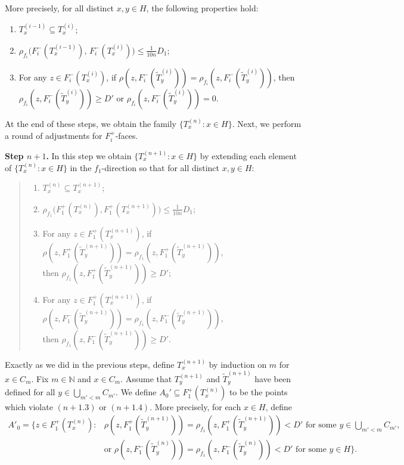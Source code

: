 \documentclass[11pt, reqno, a4paper]{amsart}
\theoremstyle{definition}
\theoremstyle{plain}
\begin{document}
More precisely, for all distinct $x,y\in H$, the following
properties hold:
\begin{enumerate}[label=($i$.\arabic*),leftmargin=3.2em]
  \item $T_x^{(i-1)}\subseteq T_x^{(i)}$;
  \item $\rho_{f_i}\!\bigl(F_i^-(T_x^{(i-1)}),\,F_i^-(T_x^{(i)})\bigr)\le \frac{1}{10n}D_1$;
  \item For any $z\in F_i^-(T_x^{(i)})$, if $\rho(z, F_i^-(\widetilde T_y^{(i)}))=\rho_{f_i}(z, F_i^-(\widetilde T_y^{(i)}))$, then $\rho_{f_i}(z, F_i^-(\widetilde T_y^{(i)}))\ge D'$ or $\rho_{f_i}(z, F_i^-(\widetilde T_y^{(i)}))=0$.
\end{enumerate}


\medskip
\noindent
At the end of these steps, we obtain the family $\{T_x^{(n)}\colon x\in H\}$. Next, we perform a round of adjustments for $F_i^+$-faces.

\medskip
\noindent\textbf{Step $n+1$.}
In this step we obtain $\{T_x^{(n+1)}:x\in H\}$ by extending each element of $\{T_x^{(n)}:x\in H\}$ in the $f_1$-direction so that
for all distinct $x,y\in H$:
\begin{quote}
\begin{enumerate}[label=($n+1$.\arabic*),leftmargin=3.2em]
\item $T_x^{(n)}\subseteq T_x^{(n+1)}$;
  \item $\rho_{f_1}\bigl(F_1^+(T_x^{(n)}),F_1^+(T_x^{(n+1)})\bigr)\le \frac{1}{10n}D_1$;
\item  For any $z\in F_1^+(T_x^{(n+1)})$, if $\rho(z, F_1^+(\widetilde T_y^{(n+1)}))=
\rho_{f_1}(z, F_1^+(\widetilde T_y^{(n+1)}))$, \\then $\rho_{f_1}(z, F_1^+(\widetilde T_y^{(n+1)}))\ge D'$;
\item  For any $z\in F_1^+(T_x^{(n+1)})$, if $\rho(z, F_1^-(\widetilde T_y^{(n+1)}))=
\rho_{f_1}(z, F_1^-(\widetilde T_y^{(n+1)}))$, \\then $\rho_{f_1}(z, F_1^-(\widetilde T_y^{(n+1)}))\ge D'$.
\end{enumerate}
\end{quote}

Exactly as we did in the previous steps, define $T_x^{(n+1)}$ by induction on $m$ for $x\in C_m$. Fix $m\in \mathbb{N}$ and $x\in C_m$. Assume that $T_y^{(n+1)}$ and $\widetilde T_y^{(n+1)}$ have been defined for all $y\in\bigcup_{m'<m}C_{m'}$.
We define $A_0'\subseteq F_1^+(T_x^{(n)})$ to be the points which violate $(n+1.3)$ or $(n+1.4)$. More precisely, for each $x\in H$, define 
$$
\begin{aligned}
    A'_0=\Big\{z\in F_1^+(T_x^{(n)})\colon &\rho(z, F_1^+(\widetilde T_y^{(n+1)}))=
\rho_{f_1}(z, F_1^+(\widetilde T_y^{(n+1)}))< D' \text{ for some } y \in \bigcup_{m'<m}C_{m'}, \\& \mbox{or } \rho(z, F_1^-(\widetilde T_y^{(n)}))=
\rho_{f_1}(z, F_1^-(\widetilde T_y^{(n)}))< D'\text{ for some } y \in H\Big\}.
\end{aligned}
$$
\end{document}
